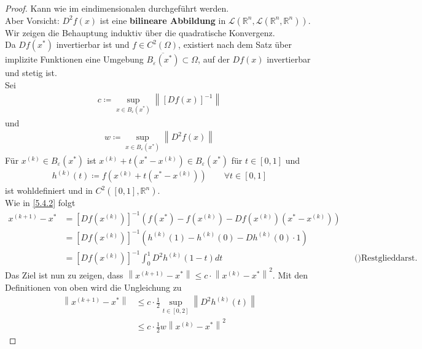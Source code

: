 \documentclass[ngerman,fontsize=11pt, paper=a4, parskip=half, titlepage=true, toc=bib]{scrbook}
\newcommand{\Ren}{\mathds{R}^{n}}
\newcommand{\nn}[1]{\left\| #1 \right\|}
\begin{document}
  \begin{proof}
    Kann wie im eindimensionalen durchgeführt werden.\\
    Aber Vorsicht: $D^2f(x)$ ist eine \textbf{bilineare Abbildung} in 
    $\mathcal{L}(\Ren, \mathcal{L}(\Ren, \Ren))$. \\
    
    Wir zeigen die Behauptung induktiv über die quadratische Konvergenz.\\
    Da $Df(x^{*})$ invertierbar ist und $f\in C^2(\Omega) $,
    existiert nach dem Satz über implizite Funktionen
    eine Umgebung $\overline{B_\varepsilon(x^{*})}\subset \Omega$,
    auf der $Df(x)$ invertierbar und stetig ist.\\
    Sei 
    \begin{gather*}
      c\coloneqq \sup_{x\in B_\varepsilon(x^{*})} \nn{[Df(x)]^{-1}}
    \end{gather*}
    und 
    \begin{gather*}
      w\coloneqq \sup_{x\in B_\varepsilon(x^{*})}\nn{D^2f(x)}
    \end{gather*}
    Für $x^{(k)}\in B_\varepsilon(x^{*}) $ ist $x^{(k)}+t(x^{*}-x^{(k)})\in B_\varepsilon(x^{*})$
    für $t\in [0,1]$ und 
    \begin{gather*}
      h^{(k)}(t) \coloneqq f(x^{(k)}+ t(x^{*}-x^{(k)}))\qquad \forall t\in [0,1]
    \end{gather*}
    ist wohldefiniert und in $C^2([0,1], \Ren)$.\\
    Wie in \ref{5.4.2} folgt 
    \begin{align*}
      x^{(k+1)}-x^{*} &= [Df(x^{(k)})]^{-1}\left(f(x^{*})-f(x^{(k)})-Df(x^{(k)})(x^{*}-x^{(k)})\right)\\
                      &= [Df(x^{(k)})]^{-1}\left( h^{(k)}(1)-h^{(k)}(0)-Dh^{(k)}(0)\cdot 1\right)\\
                      &= [Df(x^{(k)})]^{-1} \int_{0}^{1}D^2h^{(k)}(1-t)dt &&\text{()Restglieddarst. der Taylorentw.)}
    \end{align*}
    Das Ziel ist nun zu zeigen, dass $\nn{x^{(k+1)}-x^{*}} \leq c\cdot \nn{x^{(k)}-x^{*}}^2$.
    Mit den Definitionen von oben wird die Ungleichung zu
    \begin{align}\nonumber
      \nn{x^{(k+1)}-x^{*}} &\leq c\cdot \frac{1}{2} \sup_{t\in[0,2]} \nn{D^2h^{(k)}(t)} \\
                           & \leq c\cdot \frac{1}{2} w\nn{x^{(k)}-x^{*}}^2
                             \label{V.5.5}
    \end{align}

\end{proof}
\end{document}

